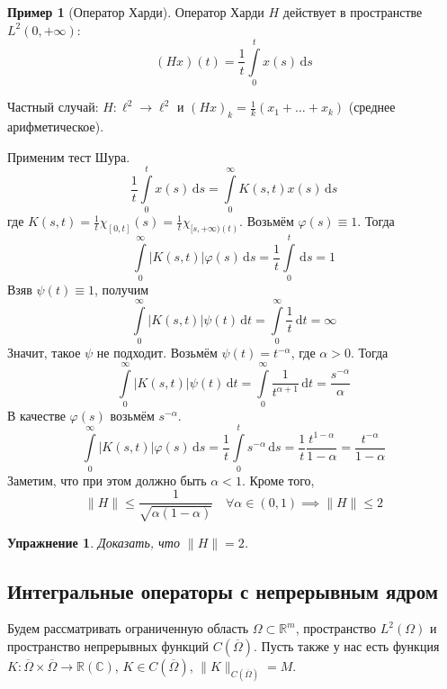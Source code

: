 \documentclass[11pt,openany,a4paper]{scrartcl}
\theoremstyle{plain}
\newtheorem{exercise}[theorem]{Упражнение}
\theoremstyle{definition}
\newtheorem{example}[theorem]{Пример}
\newcommand\mb{\mathbb}
\newcommand\real{\mb R}
\newcommand{\complex}{\mb C}
\newcommand{\dif}{\, \mathrm d}
\begin{document}
\begin{example}[Оператор Харди]
    Оператор Харди $H$ действует в пространстве $L^2(0, +\infty)$:
    $$
    (Hx)(t) = \frac{1}{t}\int\limits_0^t x(s) \dif s
    $$
    
    Частный случай: $H: \ell^2 \to \ell^2$ и
    $(Hx)_k = \frac{1}{k}(x_1 + \ldots + x_k)$ (среднее арифметическое).
    
    Применим тест Шура.
    $$
    \frac{1}{t}\int\limits_0^t x(s) \dif s = \int\limits_0^\infty K(s,t)x(s)\dif s
    $$
    где $K(s,t) = \frac{1}{t}\chi_{[0,t]}(s) = \frac{1}{t}\chi_{[s, +\infty)(t)}$.
    Возьмём $\varphi(s) \equiv 1$. Тогда
    $$
    \int\limits_0^\infty|K(s,t)|\varphi(s) \dif s =
    \frac{1}{t}\int\limits_0^t \dif s = 1
    $$
    Взяв $\psi(t) \equiv 1$, получим
    $$
    \int\limits_0^\infty|K(s,t)|\psi(t) \dif t = \int\limits_0^\infty \frac{1}{t}
    \dif t = \infty
    $$
    Значит, такое $\psi$ не подходит. Возьмём $\psi(t) = t^{-\alpha}$, где
    $\alpha > 0$. Тогда
    $$
    \int\limits_0^\infty|K(s,t)|\psi(t) \dif t =
    \int\limits_0^\infty \frac{1}{t^{\alpha + 1}} \dif t =
    \frac{s^{-\alpha}}{\alpha}
    $$
    В качестве $\varphi(s)$ возьмём $s^{-\alpha}$.
    $$
    \int\limits_0^\infty|K(s,t)|\varphi(s) \dif s =
    \frac{1}{t} \int\limits_0^t s^{-\alpha} \dif s =
    \frac{1}{t} \frac{t^{1- \alpha}}{1 - \alpha} =
    \frac{t^{-\alpha}}{1 - \alpha}
    $$
    Заметим, что при этом должно быть $\alpha < 1$. Кроме того,
    $$
    \|H\| \leqslant \frac{1}{\sqrt{\alpha(1 - \alpha)}}\quad
    \forall \alpha \in (0, 1) \implies \|H\| \leqslant 2
    $$
\end{example}
\begin{exercise}
    Доказать, что $\|H\| = 2$.
\end{exercise}

\subsection{Интегральные операторы с непрерывным ядром}

Будем рассматривать ограниченную область $\Omega \subset \real^m$, пространство
$L^2(\Omega)$ и пространство непрерывных функций $C(\overline\Omega)$. Пусть также
у нас есть функция
$K: \overline\Omega \times \overline\Omega \to \real(\complex)$,
$K \in C(\overline\Omega)$, $\|K\|_{C(\overline\Omega)} = M$.
\end{document}
